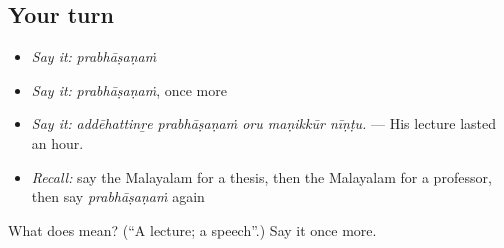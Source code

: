 \subsection*{Your turn}
\begin{itemize}
\raggedright
  \item \emph{Say it:} \emph{prabhāṣaṇaṁ}
  \item \emph{Say it:} \emph{prabhāṣaṇaṁ}, once more
  \item \emph{Say it:} \emph{addēhattinṟe prabhāṣaṇaṁ oru maṇikkūr nīṇṭu.} — His lecture lasted an hour.
  \item \emph{Recall:} say the Malayalam for a thesis, then the Malayalam for a professor, then say \emph{prabhāṣaṇaṁ} again
\end{itemize}

\begin{tcolorbox}[breakable,colback=teal!4,colframe=teal!35!black,title={Before you move on}]
What does  mean? (\textquotedblleft{}A lecture; a speech\textquotedblright{}.) Say it once more.
\end{tcolorbox}
